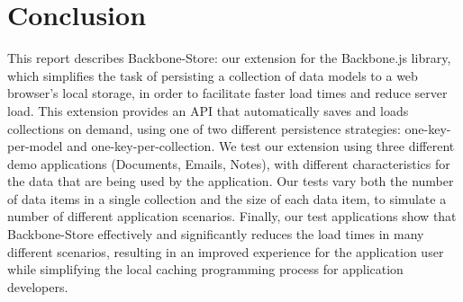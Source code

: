\documentclass[12pt]{article}
\begin{document}
\section{Conclusion}

This report describes Backbone-Store: our extension for the Backbone.js library, which
simplifies the task of persisting a collection of data models to a web
browser's local storage, in order to facilitate faster load times and reduce
server load. This extension provides an API that automatically saves and loads collections on demand, using one of two different persistence strategies: one-key-per-model and one-key-per-collection. We test our extension using three different demo applications (Documents, Emails, Notes), with different characteristics for the data that are being used by the application. Our tests
vary both the number of data items in a single collection and the size of
each data item, to simulate a number of different application scenarios. Finally, our
test applications show that Backbone-Store effectively and significantly reduces the load times in many different scenarios, resulting in an improved experience for the application
user while simplifying the local caching programming process for application developers.



\end{document}
